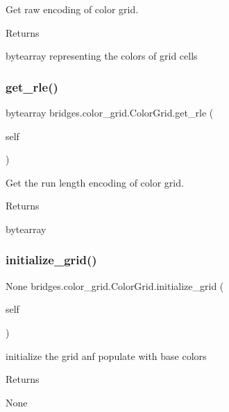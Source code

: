 Get raw encoding of color grid. 

\begin{DoxyReturn}{Returns}


bytearray representing the colors of grid cells 
\end{DoxyReturn}
\mbox{\label{classbridges_1_1color__grid_1_1_color_grid_a1a8e0a96bb381a7359aff7cff05b0d16}} 
\subsubsection{\texorpdfstring{get\_rle()}{get\_rle()}}
{\footnotesize\ttfamily  bytearray bridges.\+color\+\_\+grid.\+Color\+Grid.\+get\+\_\+rle (\begin{DoxyParamCaption}\item[{}]{self }\end{DoxyParamCaption})}



Get the run length encoding of color grid. 

\begin{DoxyReturn}{Returns}


bytearray 
\end{DoxyReturn}
\mbox{\label{classbridges_1_1color__grid_1_1_color_grid_a7b21de607d59433f390ad4026aa9c3cf}} 
\subsubsection{\texorpdfstring{initialize\_grid()}{initialize\_grid()}}
{\footnotesize\ttfamily  None bridges.\+color\+\_\+grid.\+Color\+Grid.\+initialize\+\_\+grid (\begin{DoxyParamCaption}\item[{}]{self }\end{DoxyParamCaption})}



initialize the grid anf populate with base colors 

\begin{DoxyReturn}{Returns}


None 
\end{DoxyReturn}
\mbox{\label{classbridges_1_1color__grid_1_1_color_grid_a6160377225834aa80a5454fe5186da1e}} 
